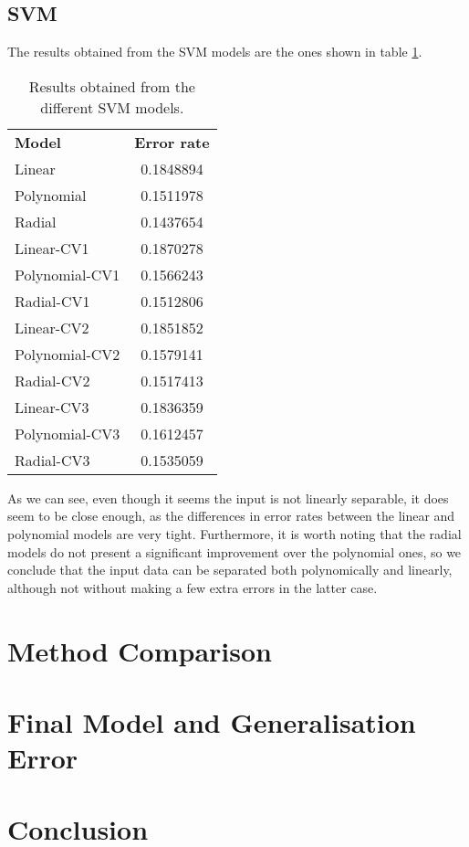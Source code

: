 \documentclass[english]{scrartcl}
\begin{document}
    \subsection{SVM}
    The results obtained from the SVM models are the ones shown in table \ref{table:svm-results}.
    
    \begin{table}[h]
    \centering
    \begin{tabular}{l c}
    \textbf{Model} & \textbf{Error rate} \\
    Linear & 0.1848894 \\
	Polynomial & 0.1511978 \\
	Radial & 0.1437654 \\
	Linear-CV1 & 0.1870278 \\
	Polynomial-CV1 & 0.1566243 \\
	Radial-CV1 & 0.1512806 \\
	Linear-CV2 & 0.1851852 \\
	Polynomial-CV2 & 0.1579141 \\
	Radial-CV2 & 0.1517413 \\
	Linear-CV3 & 0.1836359 \\
	Polynomial-CV3 & 0.1612457 \\
	Radial-CV3 & 0.1535059 \\
    \end{tabular}
    \caption{Results obtained from the different SVM models.}
    \label{table:svm-results}
    \end{table}
    
    As we can see, even though it seems the input is not linearly separable, it does seem to be close enough, as the differences in error rates between the linear and polynomial models are very tight. Furthermore, it is worth noting that the radial models do not present a significant improvement over the polynomial ones, so we conclude that the input data can be separated both polynomically and linearly, although not without making a few extra errors in the latter case.

\section{Method Comparison}

\section{Final Model and Generalisation Error}

\section{Conclusion}
\end{document}
